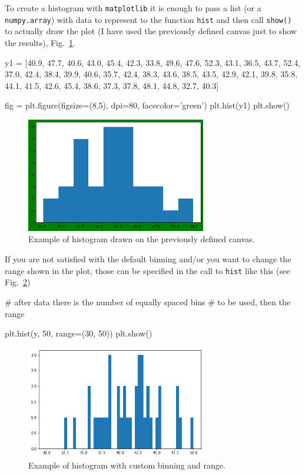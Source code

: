 To create a histogram with \texttt{matplotlib} it is enough to pass a list (or a \texttt{numpy.array}) with data to represent to the function \texttt{hist} and then call \texttt{show()} to actually draw the plot (I have used the previously defined canvas just to show the results), Fig.~\ref{fig:histo1}.

\begin{ipython}
y1 = [40.9, 47.7, 40.6, 43.0, 45.4, 42.3, 33.8, 49.6,
47.6, 52.3, 43.1, 36.5, 43.7, 52.4, 37.0, 42.4, 38.4, 39.9, 40.6, 35.7, 42.4,
38.3, 43.6, 38.5, 43.5, 42.9, 42.1, 39.8, 35.8, 44.1,
41.5, 42.6, 45.4, 38.6, 37.3, 37.8, 48.1, 44.8, 32.7, 40.3]

fig = plt.figure(figsize=(8,5), dpi=80, facecolor='green')
plt.hist(y1)
plt.show()
\end{ipython}

\begin{figure}[htb]
	\centering
	\includegraphics[width=0.7\textwidth]{figures/histo1}
	\caption{Example of histogram drawn on the previously defined canvas.}
	\label{fig:histo1}
\end{figure}

If you are not satisfied with the default binning and/or you want to change the range shown in the plot, those can be specified in the call to \texttt{hist} like this (see Fig.~\ref{fig:histo2})

\begin{ipython}
# after data there is the number of equally spaced bins
# to be used, then the range

plt.hist(y, 50, range=(30, 50))
plt.show()
\end{ipython}

\begin{figure}[htb]
	\centering
	\includegraphics[width=0.7\textwidth]{figures/histo2}
	\caption{Example of histogram with custom binning and range.}
	\label{fig:histo2}
\end{figure}

